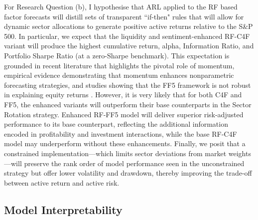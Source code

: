 For Research Question (b), I hypothesise that ARL applied to the RF based factor forecasts will distill sets of transparent “if-then" rules that will allow for dynamic sector allocations to generate positive active returns relative to the S\&P 500. In particular, we expect that the liquidity and sentiment-enhanced RF-C4F variant will produce the highest cumulative return, alpha, Information Ratio, and Portfolio Sharpe Ratio (at a zero-Sharpe benchmark). This expectation is grounded in recent literature that highlights the pivotal role of momentum, empirical evidence demonstrating that momentum enhances nonparametric forecasting strategies, and studies showing that the FF5 framework is not robust in explaining equity returns \cite{simonian_2019,gu_2020,sarwarff5}. However, it is very likely that for both C4F and FF5, the enhanced variants will outperform their base counterparts in the Sector Rotation strategy.  Enhanced RF-FF5 model will deliver superior risk-adjusted performance to its base counterpart, reflecting the additional information encoded in profitability and investment interactions, while the base RF-C4F model may underperform without these enhancements. Finally, we posit that a constrained implementation—which limits sector deviations from market weights—will preserve the rank order of model performance seen in the unconstrained strategy but offer lower volatility and drawdown, thereby improving the trade-off between active return and active risk.



\subsection{Model Interpretability}




